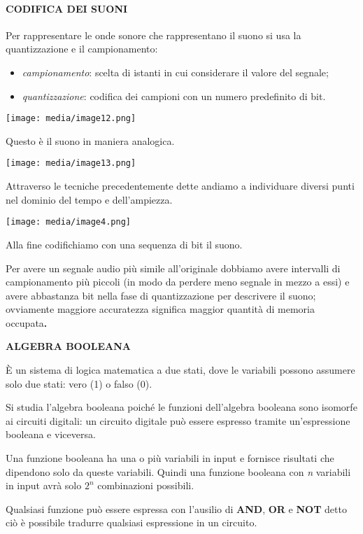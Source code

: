 \paragraph{CODIFICA DEI SUONI}\label{codifica-dei-suoni}

Per rappresentare le onde sonore che rappresentano il suono si usa la
quantizzazione e il campionamento:

\begin{itemize}
\item
  \emph{campionamento}: scelta di istanti in cui considerare il valore
  del segnale;
\item
  \emph{quantizzazione}: codifica dei campioni con un numero predefinito
  di bit.
\end{itemize}

\texttt{[image: media/image12.png]}

Questo è il suono in maniera analogica.

\texttt{[image: media/image13.png]}

Attraverso le tecniche precedentemente dette andiamo a individuare
diversi punti nel dominio del tempo e dell'ampiezza.

\texttt{[image: media/image4.png]}

Alla fine codifichiamo con una sequenza di bit il suono.

Per avere un segnale audio più simile all'originale dobbiamo avere
intervalli di campionamento più piccoli (in modo da perdere meno segnale
in mezzo a essi) e avere abbastanza bit nella fase di quantizzazione per
descrivere il suono; ovviamente maggiore accuratezza significa maggior
quantità di memoria occupata\textbf{.}

\textbf{ALGEBRA BOOLEANA}

È un sistema di logica matematica a due stati, dove le variabili possono
assumere solo due stati: vero (1) o falso (0).

Si studia l'algebra booleana poiché le funzioni dell'algebra booleana
sono isomorfe ai circuiti digitali: un circuito digitale può essere
espresso tramite un'espressione booleana e viceversa.

Una funzione booleana ha una o più variabili in input e fornisce
risultati che dipendono solo da queste variabili. Quindi una funzione
booleana con \emph{n} variabili in input avrà solo \(2^{n}\)
combinazioni possibili.

Qualsiasi funzione può essere espressa con l'ausilio di \textbf{AND},
\textbf{OR} e \textbf{NOT} detto ciò è possibile tradurre qualsiasi
espressione in un circuito.

